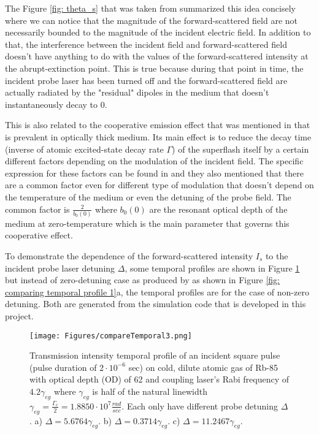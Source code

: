 The Figure \ref{fig: theta_s} that was taken from \cite{Kwong2014} summarized this idea concisely where we can notice that the magnitude of the forward-scattered field are not necessarily bounded to the magnitude of the incident electric field. In addition to that, the interference between the incident field and forward-scattered field doesn't have anything to do with the values of the forward-scattered intensity at the abrupt-extinction point. This is true because during that point in time, the incident probe laser has been turned off and the forward-scattered field are actually radiated by the "residual" dipoles in the medium that doesn't instantaneously decay to $0$.

This is also related to the cooperative emission effect that was mentioned in \cite{Kwong2014, Kwong2015, Kwong2017, Araujo2016} that is prevalent in optically thick medium. Its main effect is to reduce the decay time (inverse of atomic excited-state decay rate $\Gamma$) of the superflash itself by a certain different factors depending on the modulation of the incident field. The specific expression for these factors can be found in \cite{Kwong2017} and they also mentioned that there are a common factor even for different type of modulation that doesn't depend on the temperature of the medium or even the detuning of the probe field. The common factor is $\frac{2}{b_{0}(0)}$ where $b_{0}(0)$ are the resonant optical depth of the medium at zero-temperature which is the main parameter that governs this cooperative effect.

To demonstrate the dependence of the forward-scattered intensity $I_{s}$ to the incident probe laser detuning $\Delta$, some temporal profiles are shown in Figure \ref{fig: comparing temporal profile 2} but instead of zero-detuning case as produced by \cite{jeong2010slow} as shown in Figure \ref{fig: comparing temporal profile 1}a, the temporal profiles are for the case of non-zero detuning. Both are generated from the simulation code that is developed in this project.

\begin{figure}
    \centering
    \texttt{[image: Figures/compareTemporal3.png]}
    \caption{Transmission intensity temporal profile of an incident square pulse (pulse duration of $2\cdot10^{-6}$ sec) on cold, dilute atomic gas of Rb-85 with optical depth (OD) of 62 and coupling laser's Rabi frequency of $4.2\gamma_{eg}$ where $\gamma_{eg}$ is half of the natural linewidth $\gamma_{eg} = \frac{\Gamma_{e}}{2} = 1.8850 \cdot 10^{7} \frac{rad}{sec}$. Each only have different probe detuning $\Delta$. a) $\Delta = 5.6764\gamma_{eg}$. b) $\Delta = 0.3714\gamma_{eg}$. c) $\Delta = 11.2467\gamma_{eg}$.}
    \label{fig: comparing temporal profile 2}
\end{figure}

